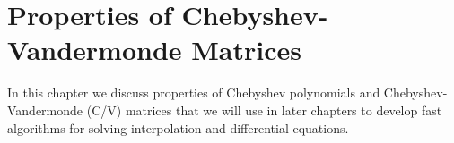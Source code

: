 \chapter{Properties of Cheby\-shev-Vander\-monde Ma\-trices}
\label{chap:CV_Prop}

In this chapter we discuss properties of Chebyshev polynomials
and Chebyshev-Vander\-monde (C\-/V) matrices that we will
use in later chapters to develop fast algorithms for
solving interpolation and differential equations.

